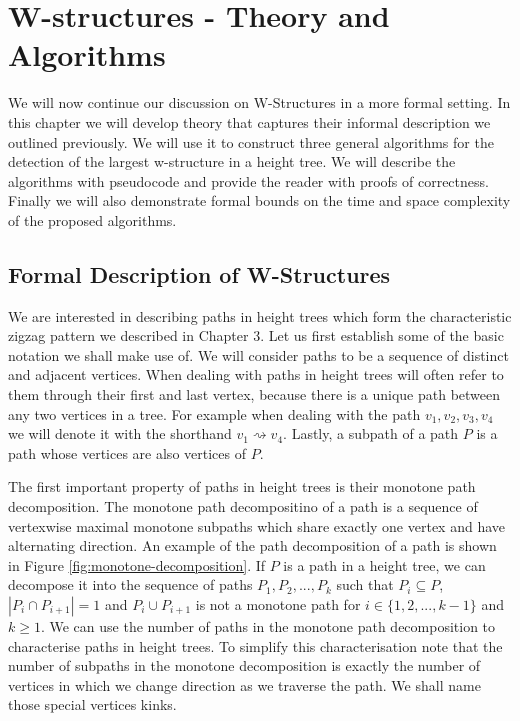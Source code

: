 \chapter{W-structures - Theory and Algorithms}
\label{chapter4}

We will now continue our discussion on W-Structures in a more formal setting. In this chapter we will develop theory that captures their informal description we outlined previously. We will use it to construct three general algorithms for the detection of the largest w-structure in a height tree. We will describe the algorithms with pseudocode and provide the reader with proofs of correctness. Finally we will also demonstrate formal bounds on the time and space complexity of the proposed algorithms.

\section{Formal Description of W-Structures}


We are interested in describing paths in height trees which form the characteristic zigzag pattern we described in Chapter 3. Let us first establish some of the basic notation we shall make use of. We will consider paths to be a sequence of distinct and adjacent vertices. When dealing with paths in height trees will often refer to them through their first and last vertex, because there is a unique path between any two vertices in a tree. For example when dealing with the path $v_1, v_2, v_3, v_4$ we will denote it with the shorthand $v_1 \rightsquigarrow v_4$. Lastly, a subpath of a path $P$ is a path whose vertices are also vertices of $P$.

The first important property of paths in height trees is their monotone path decomposition. The monotone path decompositino of a path is a sequence of vertexwise maximal monotone subpaths which share exactly one vertex and have alternating direction. An example of the path decomposition of a path is shown in Figure \ref{fig:monotone-decomposition}.
If $P$ is a path in a height tree, we can decompose it into the sequence of paths $P_1, P_2, ..., P_k$ such that $P_i \subseteq P$, $|P_i \cap P_{i+1}| = 1$ and $P_i \cup P_{i+1}$ is not a monotone path for $i \in \{1, 2, ..., k-1\}$ and $k \ge 1$. We can use the number of paths in the monotone path decomposition to characterise paths in height trees. To simplify this characterisation note that the number of subpaths in the monotone decomposition is exactly the number of vertices in which we change direction as we traverse the path. We shall name those special vertices kinks.

